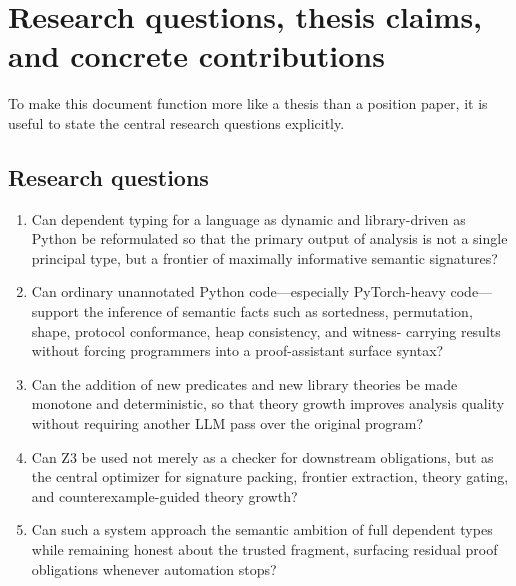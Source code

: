 \documentclass[11pt]{article}
\newcommand{\LiquidHaskell}{\textsc{LiquidHaskell}}
\newcommand{\Zthree}{\textsc{Z3}}
\theoremstyle{definition}
\theoremstyle{plain}
\begin{document}
\begin{abstract}
The emphasis of this monograph is therefore slightly different from a purely
language-theoretic treatment. We still define syntax, judgments, and semantic
objects carefully, but we place equal weight on extraction, ranking, library
modeling, protocol reasoning, contract compression, theory accretion, and novel
uses of \Zthree{} for maximal signature inference. We draw inspiration from
\LiquidHaskell{} for qualifier generation and SMT-backed checking, but we push
the idea outward to a wider design space: nominal classes, structural
protocols, heap facts, tensor theories such as PyTorch, effect summaries,
proof-carrying dependent specifications, and open-world theory packs that can be
added incrementally without rerunning any LLM. The target user is a Python
programmer or LLM writing Python-looking code, not a user expected to rewrite
their program into a proof assistant dialect.
\end{abstract}

\section{Research questions, thesis claims, and concrete contributions}

To make this document function more like a thesis than a position paper, it is
useful to state the central research questions explicitly.

\subsection{Research questions}
\begin{enumerate}[label=\textbf{RQ\arabic*.}]
  \item Can dependent typing for a language as dynamic and library-driven as
  Python be reformulated so that the primary output of analysis is not a single
  principal type, but a frontier of maximally informative semantic signatures?
  \item Can ordinary unannotated Python code---especially PyTorch-heavy
  code---support the inference of semantic facts such as sortedness,
  permutation, shape, protocol conformance, heap consistency, and witness-
  carrying results without forcing programmers into a proof-assistant surface
  syntax?
  \item Can the addition of new predicates and new library theories be made
  monotone and deterministic, so that theory growth improves analysis quality
  without requiring another LLM pass over the original program?
  \item Can \Zthree{} be used not merely as a checker for downstream
  obligations, but as the central optimizer for signature packing, frontier
  extraction, theory gating, and counterexample-guided theory growth?
  \item Can such a system approach the semantic ambition of full dependent
  types while remaining honest about the trusted fragment, surfacing residual
  proof obligations whenever automation stops?
\end{enumerate}
\end{document}
